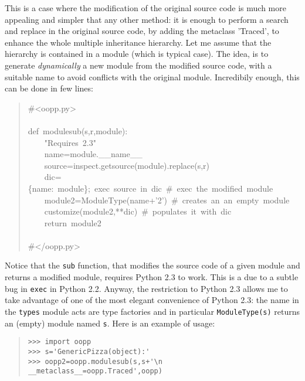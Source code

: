 \documentclass[10pt,english]{article}
\begin{document}
This is a case where the modification of the original source code is 
much more appealing and simpler that any other method: it is enough 
to perform a search and replace in the original source code, by adding
the metaclass 'Traced', to enhance the whole multiple inheritance hierarchy.
Let me assume that the hierarchy is contained in a module (which is
typical case). The idea, is to generate \emph{dynamically} a new module from the
modified source code, with a suitable name to avoid conflicts with the
original module. Incredibily enough, this can be done in few lines:
\begin{quote}
\begin{ttfamily}\begin{flushleft}
\mbox{{\#}<oopp.py>}\\
\mbox{}\\
\mbox{def~modulesub(s,r,module):}\\
\mbox{~~~~"Requires~2.3"}\\
\mbox{~~~~name=module.{\_}{\_}name{\_}{\_}}\\
\mbox{~~~~source=inspect.getsource(module).replace(s,r)}\\
\mbox{~~~~dic={\{}name:~module{\}};~exec~source~in~dic~{\#}~exec~the~modified~module}\\
\mbox{~~~~module2=ModuleType(name+'2')~{\#}~creates~an~an~empty~module~}\\
\mbox{~~~~customize(module2,**dic)~{\#}~populates~it~with~dic}\\
\mbox{~~~~return~module2}\\
\mbox{~~}\\
\mbox{{\#}</oopp.py>}
\end{flushleft}\end{ttfamily}
\end{quote}

Notice that the \texttt{sub} function, that modifies the source code of
a given module and returns a modified module, requires Python 2.3
to work. This is a due to a subtle bug in \texttt{exec} in Python 2.2.
Anyway, the restriction to Python 2.3 allows me to take advantage
of one of the most elegant convenience of Python 2.3: the name in
the \texttt{types} module acts are type factories and in particular
\texttt{ModuleType(s)} returns an (empty) module named \texttt{s}.
Here is an example of usage:
\begin{quote}
\begin{verbatim}>>> import oopp
>>> s='GenericPizza(object):'
>>> oopp2=oopp.modulesub(s,s+'\n    __metaclass__=oopp.Traced',oopp) \end{verbatim}
\end{quote}
\end{document}
